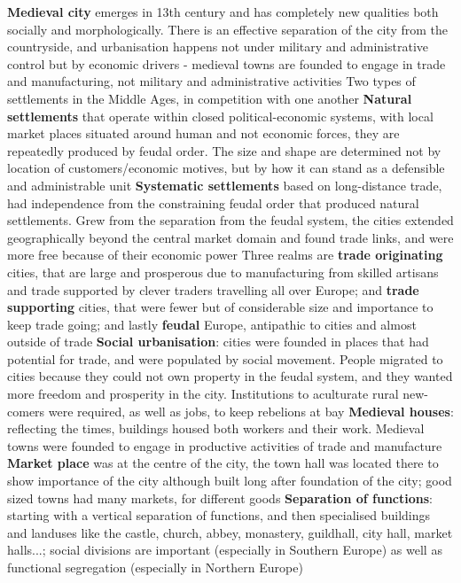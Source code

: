 \documentclass{article}
\begin{document}
\begin{outline}
	\1 \textbf{Medieval city} emerges in 13th century and has completely new qualities both socially and morphologically. There is an effective separation of the city from the countryside, and urbanisation happens not under military and administrative control but by economic drivers - medieval towns are founded to engage in trade and manufacturing, not military and administrative activities
	\1 Two types of settlements in the Middle Ages, in competition with one another
		\2 \textbf{Natural settlements} that operate within closed political-economic systems, with local market places situated around human and not economic forces, they are repeatedly produced by feudal order. The size and shape are determined not by location of customers/economic motives, but by how it can stand as a defensible and administrable unit
		\2 \textbf{Systematic settlements} based on long-distance trade, had independence from the constraining feudal order that produced natural settlements. Grew from the separation from the feudal system, the cities extended geographically beyond the central market domain and found trade links, and were more free because of their economic power
	\1 Three realms are \textbf{trade originating} cities, that are large and prosperous due to manufacturing from skilled artisans and trade supported by clever traders travelling all over Europe; and \textbf{trade supporting} cities, that were fewer but of considerable size and importance to keep trade going; and lastly \textbf{feudal} Europe, antipathic to cities and almost outside of trade
	\1 \textbf{Social urbanisation}: cities were founded in places that had potential for trade, and were populated by social movement. People migrated to cities because they could not own property in the feudal system, and they wanted more freedom and prosperity in the city. Institutions to aculturate rural new-comers were required, as well as jobs, to keep rebelions at bay
	\1 \textbf{Medieval houses}: reflecting the times, buildings housed both workers and their work. Medieval towns were founded to engage in productive activities of trade and manufacture
	\1 \textbf{Market place} was at the centre of the city, the town hall was located there to show importance of the city although built long after foundation of the city; good sized towns had many markets, for different goods
	\1 \textbf{Separation of functions}: starting with a vertical separation of functions, and then specialised buildings and landuses like the castle, church, abbey, monastery, guildhall, city hall, market halls...; social divisions are important (especially in Southern Europe) as well as functional segregation (especially in Northern Europe)

\end{outline}
\end{document}
